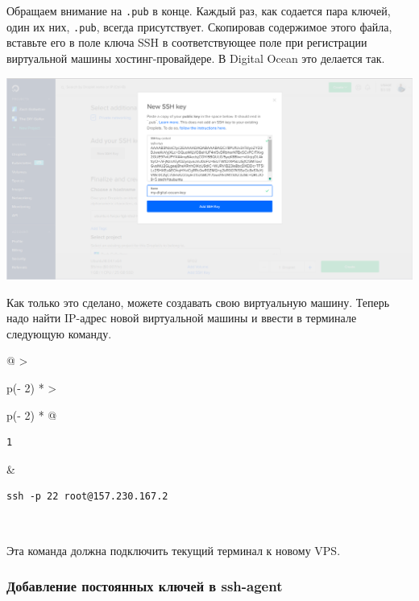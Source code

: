 \documentclass{report}
\begin{document}
Обращаем внимание на \texttt{.pub} в конце. Каждый раз, как содается
пара ключей, один их них, \texttt{.pub}, всегда присутствует. Скопировав
содержимое этого файла, вставьте его в поле ключа SSH в соответствующее
поле при регистрации виртуальной машины хостинг-провайдере. В Digital
Ocean это делается так.

\includegraphics{blog/2019/bash-essentials/digital-ocean-key.png}

Как только это сделано, можете создавать свою виртуальную машину. Теперь
надо найти IP-адрес новой виртуальной машины и ввести в терминале
следующую команду.

\begin{longtable}[]{@{}
  >{\raggedright\arraybackslash}p{(\columnwidth - 2\tabcolsep) * }
  >{\raggedright\arraybackslash}p{(\columnwidth - 2\tabcolsep) * }@{}}
\toprule
\endhead
\begin{minipage}[t]{\linewidth}\raggedright
\begin{verbatim}
1
\end{verbatim}
\end{minipage} & \begin{minipage}[t]{\linewidth}\raggedright
\begin{verbatim}
ssh -p 22 root@157.230.167.2
\end{verbatim}
\end{minipage} \\ \addlinespace
\bottomrule
\end{longtable}

Эта команда должна подключить текущий терминал к новому VPS.

\hypertarget{Permanently-Add-Keys-to-ssh-agent}{%
\subsubsection{\texorpdfstring{\protect\hyperlink{Permanently-Add-Keys-to-ssh-agent}{}Добавление
постоянных ключей в
ssh-agent}{Добавление постоянных ключей в ssh-agent}}\label{Permanently-Add-Keys-to-ssh-agent}}
\end{document}
